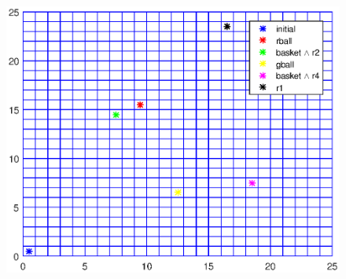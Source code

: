 \begin{figure}[!htb]
\centering
\includegraphics[scale=1]{workspace2.eps}
\label{fig:workspace2}
\end{figure}

